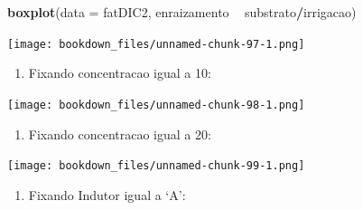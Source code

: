 \documentclass[
]{article}
\newenvironment{Shaded}{\begin{snugshade}}{\end{snugshade}}
\newcommand{\DataTypeTok}[1]{\textcolor[rgb]{0.13,0.29,0.53}{#1}}
\newcommand{\DecValTok}[1]{\textcolor[rgb]{0.00,0.00,0.81}{#1}}
\newcommand{\KeywordTok}[1]{\textcolor[rgb]{0.13,0.29,0.53}{\textbf{#1}}}
\newcommand{\NormalTok}[1]{#1}
\newcommand{\OperatorTok}[1]{\textcolor[rgb]{0.81,0.36,0.00}{\textbf{#1}}}
\newcommand{\StringTok}[1]{\textcolor[rgb]{0.31,0.60,0.02}{#1}}
\providecommand{\tightlist}{%
  \setlength{\itemsep}{0pt}\setlength{\parskip}{0pt}}
\begin{document}
\begin{Shaded}
\begin{Highlighting}[]
\KeywordTok{boxplot}\NormalTok{(}\DataTypeTok{data =}\NormalTok{ fatDIC2, enraizamento }\OperatorTok{~}\StringTok{ }\NormalTok{substrato}\OperatorTok{/}\NormalTok{irrigacao)}
\end{Highlighting}
\end{Shaded}

\texttt{[image: bookdown\_files/unnamed-chunk-97-1.png]}

\begin{enumerate}
\def\labelenumi{\arabic{enumi}.}
\setcounter{enumi}{3}
\tightlist
\item
  Fixando concentracao igual a 10:
\end{enumerate}

\begin{Shaded}
\end{Shaded}

\texttt{[image: bookdown\_files/unnamed-chunk-98-1.png]}

\begin{enumerate}
\def\labelenumi{\arabic{enumi}.}
\setcounter{enumi}{4}
\tightlist
\item
  Fixando concentracao igual a 20:
\end{enumerate}

\begin{Shaded}
\end{Shaded}

\texttt{[image: bookdown\_files/unnamed-chunk-99-1.png]}

\begin{enumerate}
\def\labelenumi{\arabic{enumi}.}
\setcounter{enumi}{5}
\tightlist
\item
  Fixando Indutor igual a `A':
\end{enumerate}
\end{document}
